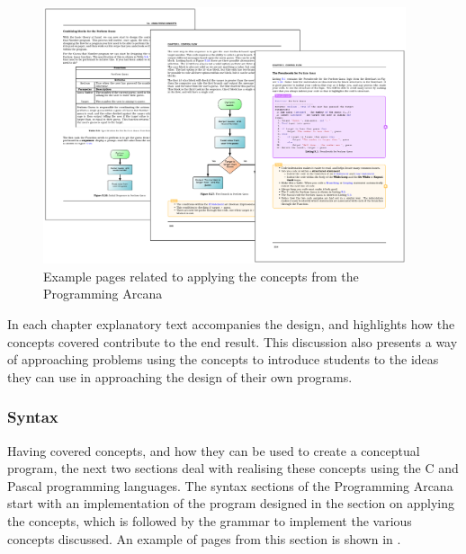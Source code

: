 \begin{figure}[h]
  \centering
  \includegraphics[width=0.95\textwidth]{ArcanaApplying}
  \caption{Example pages related to applying the concepts from the Programming Arcana}
  \label{fig:arcana_applying}
\end{figure}

In each chapter explanatory text accompanies the design, and highlights how the concepts covered contribute to the end result. This discussion also presents a way of approaching problems using the concepts to introduce students to the ideas they can use in approaching the design of their own programs.

\clearpage
\subsubsection{Syntax} %
\label{par:syntax}

Having covered concepts, and how they can be used to create a conceptual program, the next two sections deal with realising these concepts using the C and Pascal programming languages. The syntax sections of the Programming Arcana start with an implementation of the program designed in the section on applying the concepts, which is followed by the grammar to implement the various concepts discussed. An example of pages from this section is shown in .

